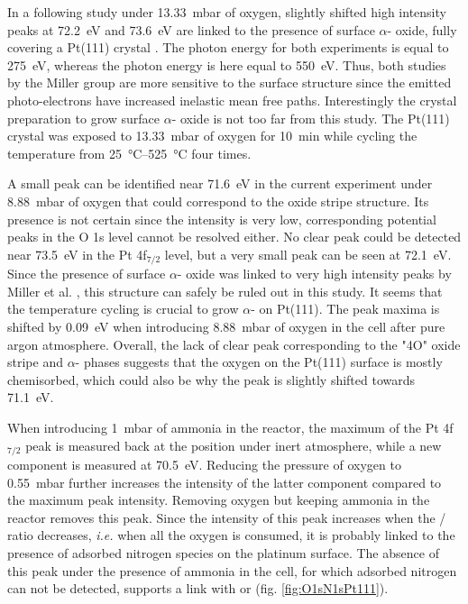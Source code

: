 In a following study under \qty{13.33}{\milli\bar} of oxygen, slightly shifted high intensity peaks at \qty{72.2}{\eV} and \qty{73.6}{\eV} are linked to the presence of surface $\alpha$- oxide, fully covering a Pt(111) crystal \parencite{Miller2014}.
The photon energy for both experiments is equal to \qty{275}{\eV}, whereas the photon energy is here equal to \qty{550}{\eV}.
Thus, both studies by the Miller group are more sensitive to the surface structure since the emitted photo-electrons have increased inelastic mean free paths.
Interestingly the crystal preparation to grow surface $\alpha$- oxide is not too far from this study.
The Pt(111) crystal was exposed to \qty{13.33}{\milli\bar} of oxygen for \qty{10}{\minute} while cycling the temperature from \qtyrange{25}{525}{\degreeCelsius} four times.

A small peak can be identified near \qty{71.6}{\eV} in the current experiment under \qty{8.88}{\milli\bar} of oxygen that could correspond to the oxide stripe structure.
Its presence is not certain since the intensity is very low, corresponding potential peaks in the O 1s level cannot be resolved either.
No clear peak could be detected near \qty{73.5}{\eV} in the Pt 4f$_{7/2}$ level, but a very small peak can be seen at \qty{72.1}{\eV}.
Since the presence of surface $\alpha$- oxide was linked to very high intensity peaks by Miller et al. \parencite*{Miller2014}, this structure can safely be ruled out in this study.
It seems that the temperature cycling is crucial to grow $\alpha$- on Pt(111).
The peak maxima is shifted by \qty{0.09}{\eV} when introducing \qty{8.88}{\milli\bar} of oxygen in the cell after pure argon atmosphere.
Overall, the lack of clear peak corresponding to the "4O" oxide stripe and $\alpha$- phases suggests that the oxygen on the Pt(111) surface is mostly chemisorbed, which could also be why the peak is slightly shifted towards \qty{71.1}{\eV}.

When introducing \qty{1}{\milli\bar} of ammonia in the reactor, the maximum of the Pt 4f$_{7/2}$ peak is measured back at the position under inert atmosphere, while a new component is measured at \qty{70.5}{\eV}.
Reducing the pressure of oxygen to \qty{0.55}{\milli\bar} further increases the intensity of the latter component compared to the maximum peak intensity.
Removing oxygen but keeping ammonia in the reactor removes this peak.
Since the intensity of this peak increases when the / ratio decreases, \textit{i.e.} when all the oxygen is consumed, it is probably linked to the presence of adsorbed nitrogen species on the platinum surface.
The absence of this peak under the presence of ammonia in the cell, for which adsorbed nitrogen can not be detected, supports a link with  or  (fig. \ref{fig:O1sN1sPt111}).

